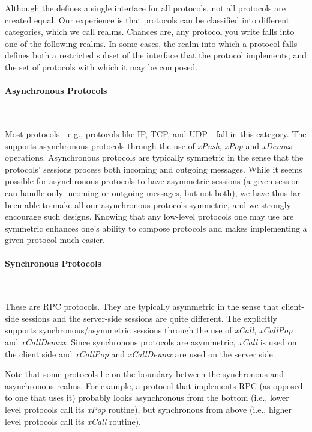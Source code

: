 Although the \xk{} defines a single interface for all protocols, not
all protocols are created equal. Our experience is that protocols can
be classified into different categories, which we call realms. Chances
are, any protocol you write falls into one of the following realms. In
some cases, the realm into which a protocol falls defines both a restricted
subset of the interface that the protocol implements, and the set of
protocols with which it may be composed.

\paragraph{Asynchronous Protocols}{\ }

\smallskip

\noindent Most protocols---e.g., protocols like IP, TCP, and UDP---fall 
in this category. The \xk{} supports asynchronous protocols through
the use of {\em xPush}, {\em xPop} and {\em xDemux} operations.
Asynchronous protocols are typically symmetric in the sense that the
protocols' sessions process both incoming and outgoing messages.
While it seems possible for asynchronous protocols to have asymmetric
sessions (a given session can handle only incoming or outgoing
messages, but not both), we have thus far been able to make all our
asynchronous protocols symmetric, and we strongly encourage such
designs.  Knowing that any low-level protocols one may use are
symmetric enhances one's ability to compose protocols and makes
implementing a given protocol much easier.

\paragraph{Synchronous Protocols}{\ }

\smallskip

\noindent These are RPC protocols. They are typically asymmetric in the 
sense that client-side sessions and the server-side sessions are quite
different.  The \xk{} explicitly supports synchronous/asymmetric
sessions through the use of {\em xCall}, {\em xCallPop} and {\em
xCallDemux}. Since synchronous protocols are asymmetric, {\em xCall}
is used on the client side and {\em xCallPop} and {\em xCallDeumx} are
used on the server side.

Note that some protocols lie on the boundary between the synchronous
and asynchronous realms. For example, a protocol that implements RPC
(as opposed to one that uses it) probably looks asynchronous from the
bottom (i.e., lower level protocols call its {\em xPop} routine),
but synchronous from above (i.e., higher level protocols call its
{\em xCall} routine).

